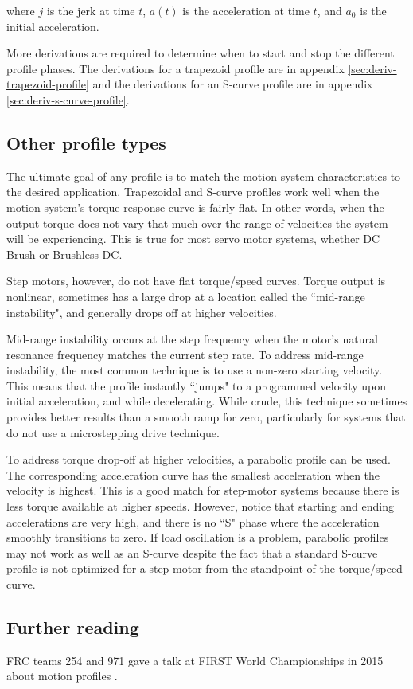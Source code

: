 where $j$ is the jerk at time $t$, $a(t)$ is the acceleration at time $t$, and
$a_0$ is the initial acceleration.

More derivations are required to determine when to start and stop the different
profile phases. The derivations for a trapezoid profile are in appendix \ref{sec:deriv-trapezoid-profile} and the derivations for an S-curve profile are in
appendix \ref{sec:deriv-s-curve-profile}.

\subsection{Other profile types}

The ultimate goal of any profile is to match the motion system characteristics
to the desired application. Trapezoidal and S-curve profiles work well when the
motion system's torque response curve is fairly flat. In other words, when the
output torque does not vary that much over the range of velocities the system
will be experiencing. This is true for most servo motor systems, whether DC
Brush or Brushless DC.

Step motors, however, do not have flat torque/speed curves. Torque output is
nonlinear, sometimes has a large drop at a location called the ``mid-range
instability", and generally drops off at higher velocities.

Mid-range instability occurs at the step frequency when the motor's natural
resonance frequency matches the current step rate. To address mid-range
instability, the most common technique is to use a non-zero starting velocity.
This means that the profile instantly ``jumps" to a programmed velocity upon
initial acceleration, and while decelerating. While crude, this technique
sometimes provides better results than a smooth ramp for zero, particularly for
systems that do not use a microstepping drive technique.

To address torque drop-off at higher velocities, a parabolic profile can be
used. The corresponding acceleration curve has the smallest acceleration when
the velocity is highest. This is a good match for step-motor systems because
there is less torque available at higher speeds. However, notice that starting
and ending accelerations are very high, and there is no ``S" phase where the
acceleration smoothly transitions to zero. If load oscillation is a problem,
parabolic profiles may not work as well as an S-curve despite the fact that a
standard S-curve profile is not optimized for a step motor from the standpoint
of the torque/speed curve.

\subsection{Further reading}

FRC teams 254 and 971 gave a talk at FIRST World Championships in 2015 about
motion profiles \cite{bib:motion-profiles}.
